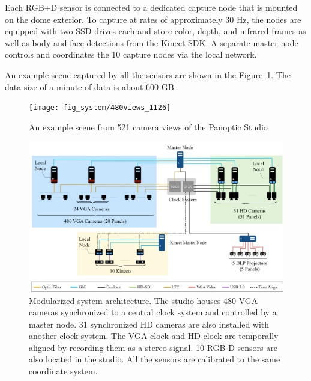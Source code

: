 
Each RGB+D sensor is connected to a dedicated capture node that is mounted on the dome exterior. To capture at rates of approximately 30 Hz, the nodes are equipped with two SSD drives each and store color, depth, and infrared frames as well as body and face detections from the Kinect SDK. A separate master node controls and coordinates the 10 capture nodes via the local network.

An example scene captured by all the sensors are shown in the Figure~\ref{fig:panopticviews}. The data size of a minute of data is about 600 GB. 

\begin{figure}[t]
	\centering       
	\texttt{[image: fig\_system/480views\_1126]}
	\caption{An example scene from 521 camera views of the Panoptic Studio}
	\label{fig:panopticviews}
\end{figure}


\begin{figure}[t]
	\includegraphics[width=\linewidth]{fig_system/panoptic_architecture}
	\caption{Modularized system architecture. The studio houses 480 VGA cameras synchronized to a central clock system and controlled by a master node. 31 synchronized HD cameras are also installed with another clock system. The VGA clock and HD clock are temporally aligned by recording them as a stereo signal. 10 RGB-D sensors are also located in the studio. All the sensors are calibrated to the same coordinate system.}
	\label{fig:architecture}
\end{figure}



